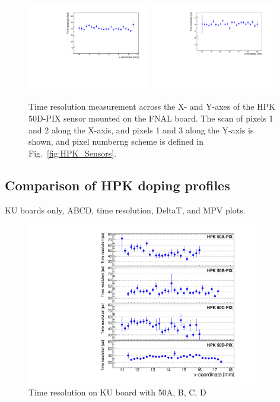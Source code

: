\documentclass[preprint,1p]{elsarticle}
\begin{document}
\begin{figure}[htbp] 
\centering
\includegraphics[width=0.48\textwidth]{figs/FNALBoard_HPK50DPix_Run847-891/TimeResolution_vs_X_Ch4_5.pdf} 
\includegraphics[width=0.48\textwidth]{figs/FNALBoard_HPK50DPix_Run847-891/TimeResolution_vs_Y_Ch3_4.pdf} 
\caption{Time resolution measurement across the X- and Y-axes of the HPK 50D-PIX sensor mounted on the FNAL board. The scan of pixels 1 and 2 along the X-axis, and pixels 1 and 3 along the Y-axis is shown, and pixel numberng scheme is defined in Fig.~\ref{fig:HPK_Sensors}.} 
\label{fig:FNAL_HPK50_SigmaTXY} 
\end{figure} 




\subsection{Comparison of HPK doping profiles}

KU boards only, ABCD, time resolution, DeltaT, and MPV plots. 

\begin{figure}[htbp] 
\centering
\includegraphics[width=0.9\textwidth]{figs/KUBoard_HPK50ABCD/KUBoard_50ABCD_TimeResolution.pdf} 
\caption{Time resolution on KU board with 50A, B, C, D } 
\label{fig:Sensors} 
\end{figure} 
\end{document}
